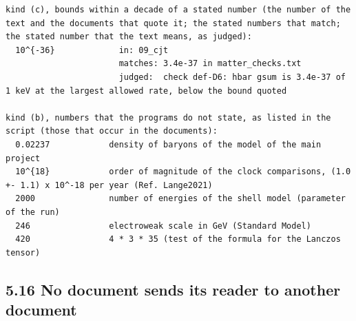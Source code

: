 \documentclass[
  10pt,
]{article}
\begin{document}
\begin{verbatim}
kind (c), bounds within a decade of a stated number (the number of the text and the documents that quote it; the stated numbers that match; the stated number that the text means, as judged):
  10^{-36}             in: 09_cjt
                       matches: 3.4e-37 in matter_checks.txt
                       judged:  check def-D6: hbar gsum is 3.4e-37 of 1 keV at the largest allowed rate, below the bound quoted

kind (b), numbers that the programs do not state, as listed in the script (those that occur in the documents):
  0.02237            density of baryons of the model of the main project
  10^{18}            order of magnitude of the clock comparisons, (1.0 +- 1.1) x 10^-18 per year (Ref. Lange2021)
  2000               number of energies of the shell model (parameter of the run)
  246                electroweak scale in GeV (Standard Model)
  420                4 * 3 * 35 (test of the formula for the Lanczos tensor)
\end{verbatim}

\hypertarget{no-document-sends-its-reader-to-another-document}{%
\subsection{5.16 No document sends its reader to another
document}\label{no-document-sends-its-reader-to-another-document}}
\end{document}
